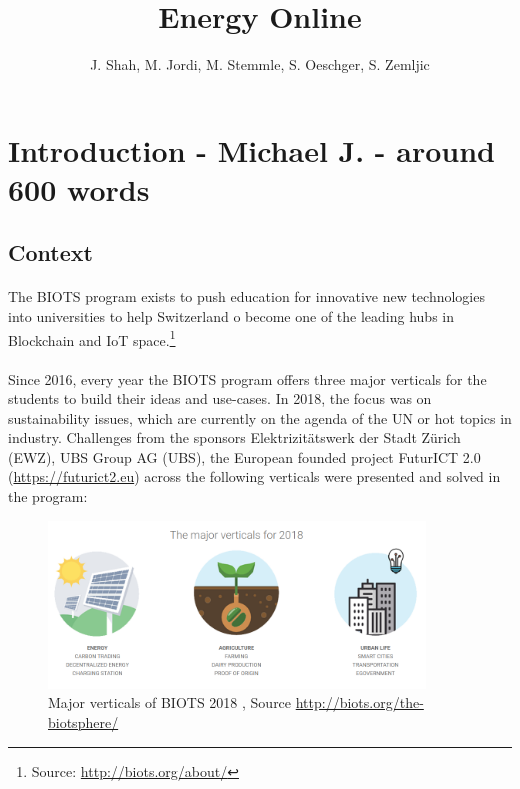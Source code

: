 \documentclass{scrartcl}
\begin{document}
	
	\title{Energy Online}
	\subtitle{}
	\author{J. Shah, M. Jordi, M. Stemmle, S. Oeschger, S. Zemljic}
	
	\maketitle
	\section{Introduction - Michael J. - around 600 words}
	
	\subsection{Context}
	
	\paragraph{}
	 The BIOTS program exists to push education for innovative new technologies into universities to help Switzerland o become one of the leading hubs in Blockchain and IoT space.\footnote{Source: \url{http://biots.org/about/}}
	 
	\paragraph{}
	Since 2016, every year the BIOTS program offers three major verticals for the students to build their ideas and use-cases. In 2018, the focus was on sustainability issues, which are currently on the agenda of the UN or hot topics in industry. Challenges from the sponsors Elektrizitätswerk der Stadt Zürich (EWZ), UBS Group AG (UBS), the European founded project FuturICT 2.0 (\url{https://futurict2.eu}) across the following verticals were presented and solved in the program:
	
	\begin{figure} [h]
		\centering
		\includegraphics[width=100mm,scale=0.5]{01_introduction_picture01.PNG}
		\caption{Major verticals of BIOTS 2018 , Source \url{http://biots.org/the-biotsphere/}}
	\end{figure}
\end{document}
